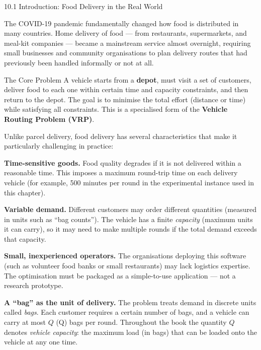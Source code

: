 \documentclass[aspectratio=169,10pt]{beamer}
\begin{document}
\begin{frame}[allowframebreaks]{10.1 Introduction: Food Delivery in the Real World}

  The COVID-19 pandemic fundamentally changed how food is distributed
  in many countries.  Home delivery of food — from restaurants,
  supermarkets, and meal-kit companies — became a mainstream service
  almost overnight, requiring small businesses and community organisations
  to plan delivery routes that had previously been handled informally or
  not at all.

  \begin{block}{The Core Problem}
    A vehicle starts from a \textbf{depot}, must visit a set of
    customers, deliver food to each one within certain time and capacity
    constraints, and then return to the depot.  The goal is to minimise
    the total effort (distance or time) while satisfying all constraints.
    This is a specialised form of the \textbf{Vehicle Routing Problem
    (VRP)}.
  \end{block}

  Unlike parcel delivery, food delivery has several characteristics that
  make it particularly challenging in practice:

  \medskip
  \textbf{Time-sensitive goods.}
  Food quality degrades if it is not delivered within a reasonable time.
  This imposes a maximum round-trip time on each delivery vehicle
  (for example, 500 minutes per round in the experimental instance used
  in this chapter).

  \medskip
  \textbf{Variable demand.}
  Different customers may order different quantities (measured in units
  such as ``bag counts'').  The vehicle has a finite \emph{capacity}
  (maximum units it can carry), so it may need to make multiple rounds
  if the total demand exceeds that capacity.

  \medskip
  \textbf{Small, inexperienced operators.}
  The organisations deploying this software (such as volunteer food banks
  or small restaurants) may lack logistics expertise.  The optimisation
  must be packaged as a simple-to-use application — not a research
  prototype.

  \medskip
  \textbf{A ``bag'' as the unit of delivery.}
  The problem treats demand in discrete units called \emph{bags}.
  Each customer requires a certain number of bags, and a vehicle can
  carry at most $Q$ (Q) bags per round.  Throughout the book the quantity
  $Q$ denotes \emph{vehicle capacity}: the maximum load (in bags) that
  can be loaded onto the vehicle at any one time.


\end{frame}
\end{document}
